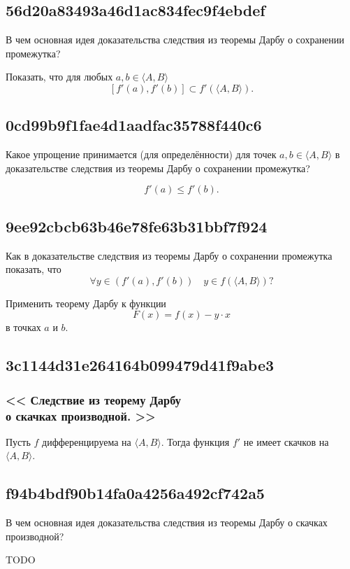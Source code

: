 \documentclass[11pt, a5paper]{article}
\newenvironment{note}[1]{\goodbreak\par\subsection{\hfill \color{lightgray}\tiny #1}}{}
\newenvironment{cloze}[2][\ldots]{\begin{leftbar}}{\end{leftbar}}
\newenvironment{icloze}[2][\ldots]{%
  \ignorespaces\text{\tiny \color{lightgray}\{#2} %
}{%
  \text{\tiny\color{lightgray}\}}\unskip%
}
\begin{document}
\begin{note}{56d20a83493a46d1ac834fec9f4ebdef}
    В чем основная идея доказательства следствия из теоремы Дарбу о сохранении промежутка?

    \begin{cloze}{1}
        Показать, что для любых \( a, b \in \langle A, B \rangle  \)
        \[
            [f'(a), f'(b)] \subset f'(\langle A, B \rangle ).
        \]
    \end{cloze}
\end{note}

\begin{note}{0cd99b9f1fae4d1aadfac35788f440c6}
    Какое упрощение принимается (для определённости) для точек \( a, b \in \langle A, B \rangle  \) в доказательстве следствия из теоремы Дарбу о сохранении промежутка?

    \begin{cloze}{1}
        \[
            f'(a) \leqslant f'(b).
        \]
    \end{cloze}
\end{note}

\begin{note}{9ee92cbcb63b46e78fe63b31bbf7f924}
    Как в доказательстве следствия из теоремы Дарбу о сохранении промежутка показать, что
    \[
        \forall y \in (f'(a), f'(b)) \quad y \in f(\langle A, B \rangle )?
    \]

    \begin{cloze}{1}
        Применить теорему Дарбу к функции
        \[
            F(x) = f(x) - y \cdot x
        \]
        в точках \( a \) и \( b \).
    \end{cloze}
\end{note}

\begin{note}{3c1144d31e264164b099479d41f9abe3}
    \subsubsection{<<\begin{icloze}{2}Следствие из теорему Дарбу \\
    \phantom{<<} \quad о скачках производной.\end{icloze}>>}

    \begin{icloze}{1}Пусть \( f \) дифференцируема на \( \langle A, B \rangle  \). Тогда функция \( f' \) не имеет скачков на \( \langle A, B \rangle  \).\end{icloze}
\end{note}

\begin{note}{f94b4bdf90b14fa0a4256a492cf742a5}
    В чем основная идея доказательства следствия из теоремы Дарбу о скачках производной?

    TODO
\end{note}
\end{document}
